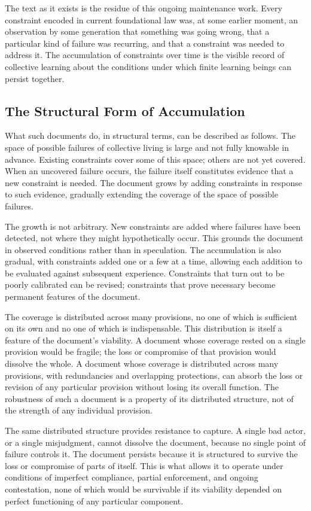 \documentclass[11pt]{article}
\begin{document}
The text as it exists is the residue of this ongoing maintenance
work. Every constraint encoded in current foundational law was,
at some earlier moment, an observation by some generation that
something was going wrong, that a particular kind of failure was
recurring, and that a constraint was needed to address it. The
accumulation of constraints over time is the visible record of
collective learning about the conditions under which finite
learning beings can persist together.

\subsection{The Structural Form of Accumulation}

What such documents do, in structural terms, can be described as
follows. The space of possible failures of collective living is
large and not fully knowable in advance. Existing constraints
cover some of this space; others are not yet covered. When an
uncovered failure occurs, the failure itself constitutes evidence
that a new constraint is needed. The document grows by adding
constraints in response to such evidence, gradually extending
the coverage of the space of possible failures.

The growth is not arbitrary. New constraints are added where
failures have been detected, not where they might hypothetically
occur. This grounds the document in observed conditions rather
than in speculation. The accumulation is also gradual, with
constraints added one or a few at a time, allowing each addition
to be evaluated against subsequent experience. Constraints that
turn out to be poorly calibrated can be revised; constraints
that prove necessary become permanent features of the document.

The coverage is distributed across many provisions, no one of
which is sufficient on its own and no one of which is
indispensable. This distribution is itself a feature of the
document's viability. A document whose coverage rested on a
single provision would be fragile; the loss or compromise of
that provision would dissolve the whole. A document whose
coverage is distributed across many provisions, with
redundancies and overlapping protections, can absorb the loss
or revision of any particular provision without losing its
overall function. The robustness of such a document is a
property of its distributed structure, not of the strength of
any individual provision.

The same distributed structure provides resistance to capture.
A single bad actor, or a single misjudgment, cannot dissolve
the document, because no single point of failure controls it.
The document persists because it is structured to survive the
loss or compromise of parts of itself. This is what allows it
to operate under conditions of imperfect compliance, partial
enforcement, and ongoing contestation, none of which would be
survivable if its viability depended on perfect functioning of
any particular component.
\end{document}
